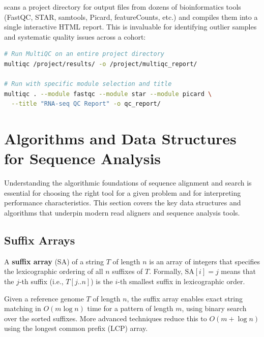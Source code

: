  scans a project directory for output files from dozens of bioinformatics tools (FastQC, STAR, samtools, Picard, featureCounts, etc.) and compiles them into a single interactive HTML report. This is invaluable for identifying outlier samples and systematic quality issues across a cohort:

\begin{lstlisting}[language=bash,caption={Running MultiQC to aggregate quality reports.},label=lst:multiqc]
# Run MultiQC on an entire project directory
multiqc /project/results/ -o /project/multiqc_report/

# Run with specific module selection and title
multiqc . --module fastqc --module star --module picard \
  --title "RNA-seq QC Report" -o qc_report/
\end{lstlisting}

\section{Algorithms and Data Structures for Sequence Analysis}
\label{sec:bioinf:algorithms}

Understanding the algorithmic foundations of sequence alignment and search is essential for choosing the right tool for a given problem and for interpreting performance characteristics. This section covers the key data structures and algorithms that underpin modern read aligners and sequence analysis tools.

\subsection{Suffix Arrays}
\label{subsec:bioinf:suffixarrays}

\begin{keyconcept}[title={Suffix Array}]
A \textbf{suffix array} (SA) of a string $T$ of length $n$ is an array of integers that specifies the lexicographic ordering of all $n$ suffixes of $T$. Formally, $\text{SA}[i] = j$ means that the $j$-th suffix (i.e., $T[j..n]$) is the $i$-th smallest suffix in lexicographic order.
\end{keyconcept}

Given a reference genome $T$ of length $n$, the suffix array enables exact string matching in $O(m \log n)$ time for a pattern of length $m$, using binary search over the sorted suffixes. More advanced techniques reduce this to $O(m + \log n)$ using the longest common prefix (LCP) array.

